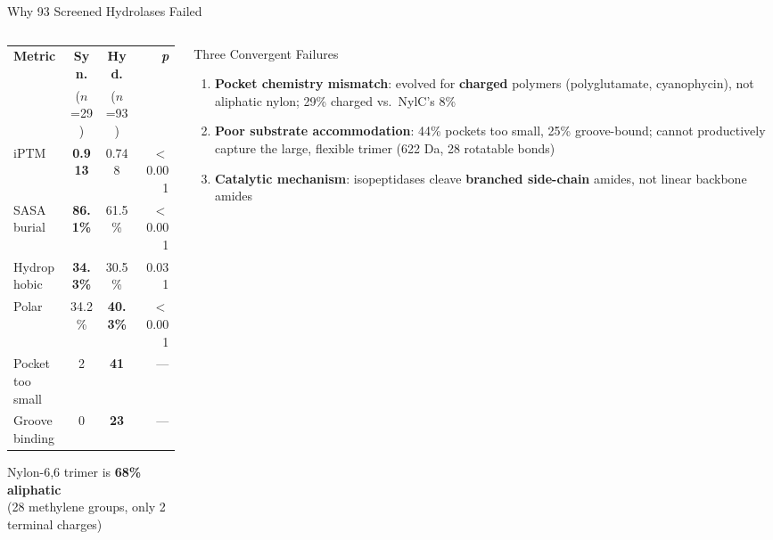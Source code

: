 \documentclass[aspectratio=169, 11pt]{beamer}
\begin{document}
\begin{frame}{Why 93 Screened Hydrolases Failed}
\vspace{-6pt}

\begin{columns}[T]
\begin{column}{0.48\textwidth}

\begin{center}
\scriptsize
\begin{tabular}{lccr}
\toprule
\textbf{Metric} & \textbf{Syn.} & \textbf{Hyd.} & \textbf{\textit{p}} \\
& {\tiny ($n$=29)} & {\tiny ($n$=93)} & \\
\midrule
iPTM & \textbf{0.913} & 0.748 & $<$0.001 \\
SASA burial & \textbf{86.1\%} & 61.5\% & $<$0.001 \\
Hydrophobic & \textbf{34.3\%} & 30.5\% & 0.031 \\
Polar & 34.2\% & \textbf{40.3\%} & $<$0.001 \\
\midrule
Pocket too small & 2 & \textcolor{accentred}{\textbf{41}} & --- \\
Groove binding & 0 & \textcolor{accentred}{\textbf{23}} & --- \\
\bottomrule
\end{tabular}
\end{center}

\vspace{4pt}
\colorbox{accentred!15}{\parbox{0.92\textwidth}{\centering\small
Nylon-6,6 trimer is \textbf{68\% aliphatic}\\(28 methylene groups, only 2 terminal charges)
}}

\end{column}
\begin{column}{0.48\textwidth}

\begin{alertblock}{\small Three Convergent Failures}
\begin{enumerate}\scriptsize
\setlength\itemsep{3pt}
\item \textbf{Pocket chemistry mismatch}: evolved for \textbf{charged} polymers (polyglutamate, cyanophycin), not aliphatic nylon; 29\% charged vs.\ NylC's 8\%
\item \textbf{Poor substrate accommodation}: 44\% pockets too small, 25\% groove-bound; cannot productively capture the large, flexible trimer (622 Da, 28 rotatable bonds)
\item \textbf{Catalytic mechanism}: isopeptidases cleave \textbf{branched side-chain} amides, not linear backbone amides
\end{enumerate}
\end{alertblock}


\end{column}
\end{columns}
\end{frame}
\end{document}
